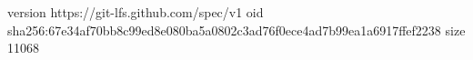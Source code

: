 version https://git-lfs.github.com/spec/v1
oid sha256:67e34af70bb8c99ed8e080ba5a0802c3ad76f0ece4ad7b99ea1a6917ffef2238
size 11068
